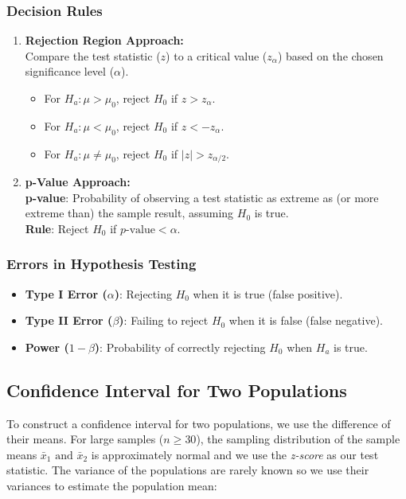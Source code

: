 \documentclass[12pt]{book}
\theoremstyle{definition}
\begin{document}
\subsubsection*{Decision Rules}
\begin{enumerate}
    \item \textbf{Rejection Region Approach:} \\
    Compare the test statistic (\( z \)) to a critical value (\( z_{\alpha} \)) based on the chosen significance level (\( \alpha \)).
    \begin{itemize}
        \item For \( H_a: \mu > \mu_0 \), reject \( H_0 \) if \( z > z_{\alpha} \).
        \item For \( H_a: \mu < \mu_0 \), reject \( H_0 \) if \( z < -z_{\alpha} \).
        \item For \( H_a: \mu \neq \mu_0 \), reject \( H_0 \) if \( |z| > z_{\alpha/2} \).
    \end{itemize}
    
    \item \textbf{p-Value Approach:} \\
    \textbf{p-value}: Probability of observing a test statistic as extreme as (or more extreme than) the sample result, assuming \( H_0 \) is true. \\
    \textbf{Rule}: Reject \( H_0 \) if \( p\text{-value} < \alpha \).
\end{enumerate}

\subsubsection*{Errors in Hypothesis Testing}
\begin{itemize}
    \item \textbf{Type I Error (\(\alpha\))}: Rejecting \( H_0 \) when it is true (false positive).
    \item \textbf{Type II Error (\(\beta\))}: Failing to reject \( H_0 \) when it is false (false negative).
    \item \textbf{Power (\(1-\beta\))}: Probability of correctly rejecting \( H_0 \) when \( H_a \) is true.
\end{itemize}

\subsection{Confidence Interval for Two Populations}
To construct a confidence interval for two populations, we use the difference of their means.
For large samples ($n \geq 30$), the sampling distribution of the sample means $\bar{x}_1 \text{ and } \bar{x}_2$ is approximately normal and we use the \textit{z-score} as our test statistic. The variance of the populations are rarely known so we use their variances to estimate the population mean:
\end{document}

